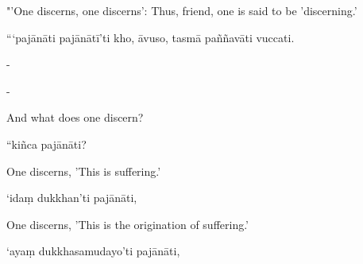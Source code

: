 \begin{samepage}
\begin{leftcolumn*}
"'One discerns, one discerns': Thus, friend, one is said to be 'discerning.'
\end{leftcolumn*}

\begin{rightcolumn}
“‘pajānāti pajānātī’ti kho, āvuso, tasmā paññavāti vuccati.
\end{rightcolumn}
\end{samepage}

\begin{samepage}
\begin{leftcolumn*}
-
\end{leftcolumn*}

\begin{rightcolumn}
-
\end{rightcolumn}
\end{samepage}

\begin{samepage}
\begin{leftcolumn*}
And what does one discern?
\end{leftcolumn*}

\begin{rightcolumn}
“kiñca pajānāti?
\end{rightcolumn}
\end{samepage}

\begin{samepage}
\begin{leftcolumn*}
One discerns, 'This is suffering.'
\end{leftcolumn*}

\begin{rightcolumn}
‘idaṃ dukkhan’ti pajānāti,
\end{rightcolumn}
\end{samepage}

\begin{samepage}
\begin{leftcolumn*}
One discerns, 'This is the origination of suffering.'
\end{leftcolumn*}

\begin{rightcolumn}
‘ayaṃ dukkhasamudayo’ti pajānāti,
\end{rightcolumn}
\end{samepage}

